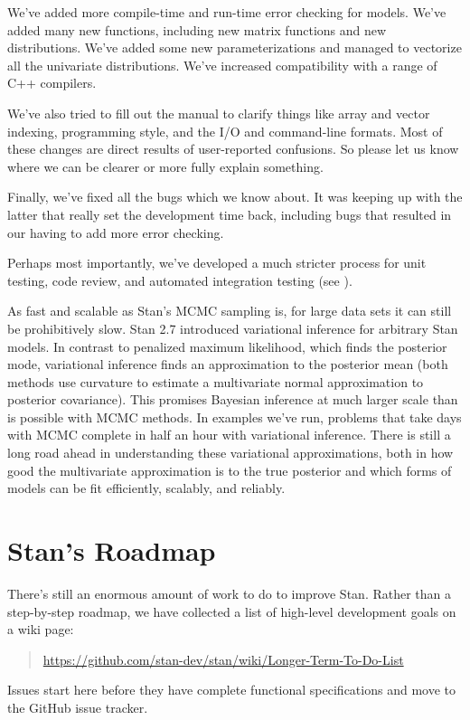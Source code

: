 We've added more compile-time and run-time error checking for models.
We've added many new functions, including new matrix functions and new
distributions.  We've added some new parameterizations and managed to
vectorize all the univariate distributions.  We've increased
compatibility with a range of C++ compilers.

We've also tried to fill out the manual to clarify things like array
and vector indexing, programming style, and the I/O and command-line
formats.  Most of these changes are direct results of user-reported
confusions.  So please let us know where we can be clearer or more
fully explain something.

Finally, we've fixed all the bugs which we know about.  It was keeping
up with the latter that really set the development time back,
including bugs that resulted in our having to add more error checking.

Perhaps most importantly, we've developed a much stricter process for
unit testing, code review, and automated integration testing (see
).

As fast and scalable as Stan's MCMC sampling is, for large data sets
it can still be prohibitively slow.  Stan 2.7 introduced variational
inference for arbitrary Stan models.  In contrast to penalized maximum
likelihood, which finds the posterior mode, variational inference
finds an approximation to the posterior mean (both methods use
curvature to estimate a multivariate normal approximation to posterior
covariance).  This promises Bayesian inference at much larger scale than is
possible with MCMC methods.  In examples we've run, problems that take
days with MCMC complete in half an hour with variational inference.
There is still a long road ahead in understanding these variational
approximations, both in how good the multivariate approximation is to
the true posterior and which forms of models can be fit efficiently,
scalably, and reliably.


\section*{Stan's Roadmap}

There's still an enormous amount of work to do to improve Stan.
Rather than a step-by-step roadmap, we have collected a list of
high-level development goals on a wiki page:
%
\begin{quote}
\url{https://github.com/stan-dev/stan/wiki/Longer-Term-To-Do-List}
\end{quote}
%
Issues start here before they have complete functional specifications
and move to the GitHub issue tracker.

